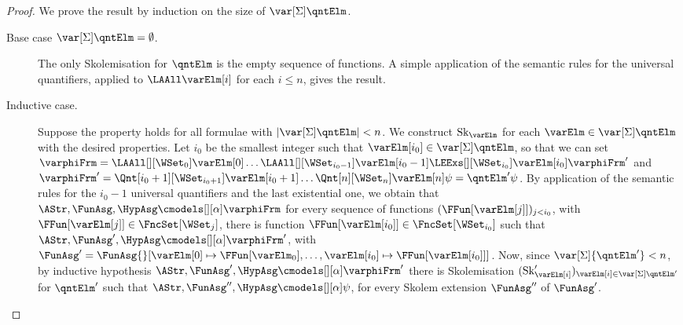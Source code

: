 \documentclass[authoryear]{elsarticle}
\newcommand{\SkolemizedSOF}{\text{Sk}}
\begin{document}
\begin{proof}
  We prove the result by induction on the size of $\var[{\Sigma}]{\qntElm}$.
	\begin{description}
	\item[Base case ${\var[{\Sigma}]{\qntElm}} = \emptyset$.] The only
    Skolemisation for $\qntElm$ is the empty sequence of functions. A simple
    application of the semantic rules for the universal quantifiers, applied to
    $\LAAll \varElm[i]$ for each $i\leq n$, gives the result.
  \item[Inductive case.] Suppose the property holds for all formulae with
    $|\var[{\Sigma}]{\qntElm}| < n$.
    We construct $\SkolemizedSOF_{\varElm}$ for each $\varElm \in \var[{\Sigma}]{\qntElm}$
    with the desired properties.
    Let $i_0$ be the smallest integer such that $\varElm[{i_0}] \in
    \var[{\Sigma}]{\qntElm}$, so that we can set $\varphiFrm = \LAAll[][\WSet_{0}]
    \varElm[0]\ldots\LAAll[][\WSet_{i_0-1}] \varElm[{i_{0}-1}]
    \LEExs[][\WSet_{i_0}]\varElm[i_0] \varphiFrm'$ and $\varphiFrm' =
    \Qnt[i_0+1][\WSet_{i_0+1}]\varElm[i_0+1]\ldots \Qnt[n][\WSet_{n}]\varElm[n]
    \psi = \qntElm'\psi$.
%
    By application of the semantic rules for the $i_0-1$ universal quantifiers
    and the last existential one, we obtain that $\AStr, \FunAsg, \HypAsg
    \cmodels[][\alpha] \varphiFrm$ \iff for every sequence of functions
    $(\FFun[{\varElm[j]}])_{j < i_0}$, with $\FFun[{\varElm[j]}] \in
    \FncSet[{\WSet_j}]{}$, there is function $\FFun[{\varElm[i_0]}] \in
    \FncSet[{\WSet_{i_0}}]{}$ such that $\AStr, \FunAsg', \HypAsg
    \cmodels[][\alpha] \varphiFrm'$, with $\FunAsg'= \FunAsg{}[{\varElm[0]}
      \mapsto {\FFun[{\varElm_0}]},\ldots, {\varElm[i_0]} \mapsto
              {\FFun[{\varElm[i_0]}]}]$.
%
    Now, since $\var[\Sigma]{\qntElm'} < n$, by inductive hypothesis $\AStr,
    \FunAsg', \HypAsg \cmodels[][\alpha] \varphiFrm'$ \iff there is
    Skolemisation $(\SkolemizedSOF'_{\varElm[i]})_{\varElm[i]\in\var[{\Sigma}]{\qntElm'}}$
    for $\qntElm'$ such that
    $\AStr, \FunAsg'', \HypAsg \cmodels[][\alpha] \psi$, for every Skolem
    extension $\FunAsg''$ of $\FunAsg'$.

\end{description}
\end{proof}
\end{document}
